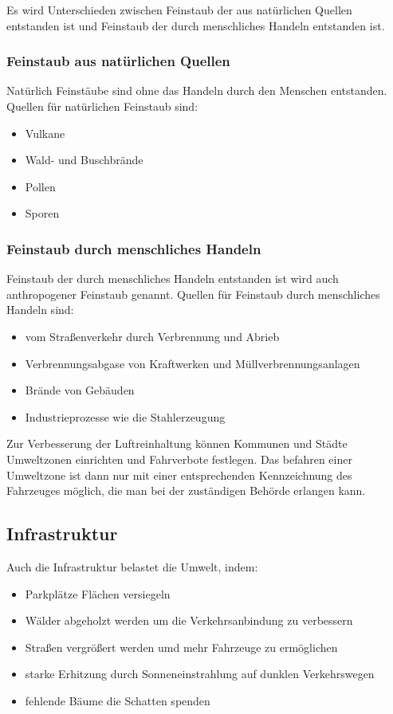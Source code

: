 Es wird Unterschieden zwischen Feinstaub der aus natürlichen Quellen entstanden ist und Feinstaub der durch menschliches Handeln entstanden ist.

\subsubsection{Feinstaub aus natürlichen Quellen}
Natürlich Feinstäube sind ohne das Handeln durch den Menschen entstanden.
Quellen für natürlichen Feinstaub sind:
\begin{itemize}
	\item Vulkane
	\item Wald- und Buschbrände
	\item Pollen
	\item Sporen
\end{itemize}


\subsubsection{Feinstaub durch menschliches Handeln}
Feinstaub der durch menschliches Handeln entstanden ist wird auch anthropogener Feinstaub genannt.
Quellen für Feinstaub durch menschliches Handeln sind:
\begin{itemize}
	\item vom Straßenverkehr durch Verbrennung und Abrieb
	\item Verbrennungsabgase von Kraftwerken und Müllverbrennungsanlagen
	\item Brände von Gebäuden
	\item Industrieprozesse wie die Stahlerzeugung
\end{itemize}

Zur Verbesserung der Luftreinhaltung können Kommunen und Städte Umweltzonen einrichten und Fahrverbote festlegen.
Das befahren einer Umweltzone ist dann nur mit einer entsprechenden Kennzeichnung des Fahrzeuges möglich, die man bei der zuständigen Behörde erlangen kann.




\subsection{Infrastruktur}
Auch die Infrastruktur belastet die Umwelt, indem:
\begin{itemize}
	\item Parkplätze Flächen versiegeln
	\item Wälder abgeholzt werden um die Verkehrsanbindung zu verbessern
	\item Straßen vergrößert werden umd mehr Fahrzeuge zu ermöglichen
	\item starke Erhitzung durch Sonneneinstrahlung auf dunklen Verkehrswegen
	\item fehlende Bäume die Schatten spenden
\end{itemize}